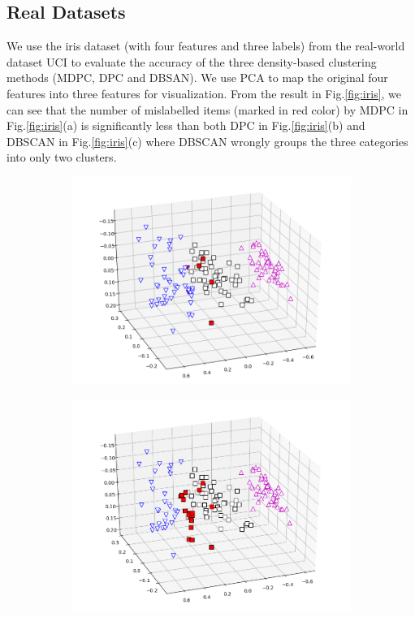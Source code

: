 \documentclass{llncs}
\begin{document}
\subsection{Real Datasets}
We use the iris dataset (with four features and three labels) from the real-world dataset UCI \cite{iris} to evaluate the accuracy of the three density-based clustering methods (MDPC, DPC and DBSAN). We use PCA to map the original four features into three features for visualization. From the result in Fig.\ref{fig:iris}, we can see that the number of mislabelled items (marked in red color) by MDPC in Fig.\ref{fig:iris}(a) is significantly less than both DPC in Fig.\ref{fig:iris}(b) and DBSCAN in Fig.\ref{fig:iris}(c) where DBSCAN wrongly groups the three categories into only two clusters.
%
\begin{figure}[ht]
\vspace*{-.4cm}
\centering
\begin{subfigure}[t]{0.32\textwidth}
\centering
\includegraphics[width=1\textwidth]{image/iris_MDPC.png}
\end{subfigure}
\begin{subfigure}[t]{0.32\textwidth}
\centering
\includegraphics[width=1\textwidth]{image/iris_dp.png}

\end{subfigure}
\end{figure}
\end{document}
